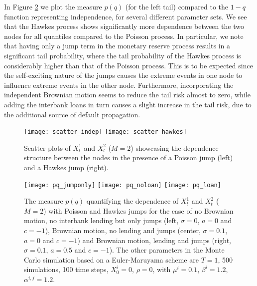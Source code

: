 \documentclass[10pt]{article}
\theoremstyle{plain}
\theoremstyle{definition}
\newcommand{\<}{\langle}
\renewcommand{\>}{\rangle}
\renewcommand{\(}{\left(}
\renewcommand{\)}{\right)}
\renewcommand{\[}{\left[}
\renewcommand{\]}{\right]}
\begin{document}
In Figure \ref{fig3} we plot the measure $p(q)$ (for the left tail) compared to the $1-q$ function representing independence, for several different parameter sets. We see that the Hawkes process shows significantly more dependence between the two nodes for all quantiles compared to the Poisson process. In particular, we note that having only a jump term in the monetary reserve process results in a significant tail probability, where the tail probability of the Hawkes process is considerably higher than that of the Poisson process. This is to be expected since the self-exciting nature of the jumps causes the extreme events in one node to influence extreme events in the other node. Furthermore, incorporating the independent Brownian motion seems to reduce the tail risk almost to zero, while adding the interbank loans in turn causes a slight increase in the tail risk, due to the additional source of default propagation.

\begin{figure}[H]
\begin{center}
  \caption{Scatter plots of $X_t^1$ and $X_t^2$ ($M=2$) showcasing the dependence structure between the nodes in the presence of a Poisson jump (left) and a Hawkes jump (right).}\label{figscat}
  \texttt{[image: scatter\_indep]}
    \texttt{[image: scatter\_hawkes]}
    \end{center}
\end{figure}
\vspace{-1cm}
\begin{figure}[H]
\begin{center}
  \caption{The measure $p(q)$ quantifying the dependence of $X_t^1$ and $X_t^2$ ($M=2$) with Poisson and Hawkes jumps for the case of no Brownian motion, no interbank lending but only jumps (left, $\sigma = 0$, $a=0$ and $c = -1$), Brownian motion, no lending and jumps (center, $\sigma = 0.1$, $a=0$ and $c=-1$) and Brownian motion, lending and jumps (right, $\sigma = 0.1$, $a=0.5$ and $c=-1$). The other parameters in the Monte Carlo simulation based on a Euler-Maruyama scheme are $T=1$, 500 simulations, 100 time steps, $X_0^i = 0$, $\rho = 0$, with $\mu^i = 0.1$, $\beta^{i}=1.2$, $\alpha^{i,j}=1.2$. }\label{fig3}
  \texttt{[image: pq\_jumponly]}
    \texttt{[image: pq\_noloan]}
    \texttt{[image: pq\_loan]}
    \end{center}
\end{figure}
\end{document}
